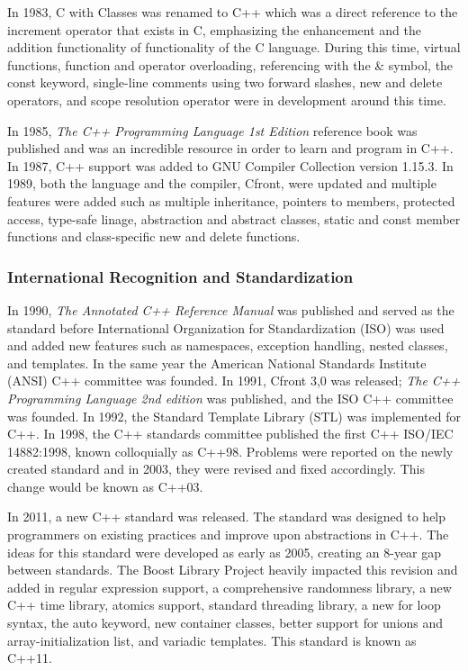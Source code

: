 \documentclass[12pt]{article}
\begin{document}
In 1983, C with Classes was renamed to C++ which was a direct reference to the increment operator that exists in C, emphasizing the enhancement and the addition functionality of functionality of the C language. During this time, virtual functions, function and operator overloading, referencing with the \& symbol, the const keyword, single-line comments using two forward slashes, new and delete operators, and scope resolution operator were in development around this time. 

In 1985, \textit{The C++ Programming Language 1st Edition} reference book was published and was an incredible resource in order to learn and program in C++. In 1987, C++ support was added to GNU Compiler Collection version 1.15.3. In 1989, both the language and the compiler, Cfront, were updated and multiple features were added such as multiple inheritance, pointers to members, protected access, type-safe linage, abstraction and abstract classes, static and const member functions and class-specific new and delete functions. 

\subsubsection{International Recognition and Standardization}
In 1990, \textit{The Annotated C++ Reference Manual} was published and served as the standard before International Organization for Standardization (ISO) was used and added new features such as namespaces, exception handling, nested classes, and templates. In the same year the American National Standards Institute (ANSI) C++ committee was founded. In 1991, Cfront 3,0 was released; \textit{The C++ Programming Language 2nd edition} was published, and the ISO C++ committee was founded. In 1992, the Standard Template Library (STL) was implemented for C++. In 1998, the C++ standards committee published the first C++ ISO/IEC 14882:1998, known colloquially as C++98. Problems were reported on the newly created standard and in 2003, they were revised and fixed accordingly. This change would be known as C++03.

In 2011, a new C++ standard was released. The standard was designed to help programmers on existing practices and improve upon abstractions in C++. The ideas for this standard were developed as early as 2005, creating an 8-year gap between standards. The Boost Library Project heavily impacted this revision and added in regular expression support, a comprehensive randomness library, a new C++ time library, atomics support, standard threading library, a new for loop syntax, the auto keyword, new container classes, better support for unions and array-initialization list, and variadic templates. This standard is known as C++11.
\end{document}
